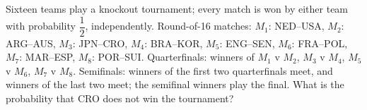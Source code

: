 Sixteen teams play a knockout tournament; every match is won by either team with probability $\dfrac12$, independently. Round-of-16 matches: $M_1$: NED--USA, $M_2$: ARG--AUS, $M_3$: JPN--CRO, $M_4$: BRA--KOR, $M_5$: ENG--SEN, $M_6$: FRA--POL, $M_7$: MAR--ESP, $M_8$: POR--SUI. Quarterfinals: winners of $M_1$ v $M_2$, $M_3$ v $M_4$, $M_5$ v $M_6$, $M_7$ v $M_8$. Semifinals: winners of the first two quarterfinals meet, and winners of the last two meet; the semifinal winners play the final. What is the probability that CRO does not win the tournament?
